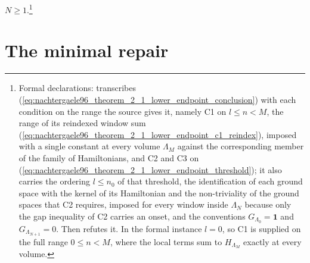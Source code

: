 \documentclass{article}
\begin{document}
$N\geq1$.\footnote{Formal declarations:
     transcribes
    (\ref{eq:nachtergaele96_theorem_2_1_lower_endpoint_conclusion}) with each
    condition on the range the source gives it, namely C1 on $l\leq n<M$, the
    range of its reindexed window sum
    (\ref{eq:nachtergaele96_theorem_2_1_lower_endpoint_c1_reindex}), imposed
    with a single constant at every volume $\Lambda_M$ against the
    corresponding member of the family of Hamiltonians, and C2 and C3 on
    (\ref{eq:nachtergaele96_theorem_2_1_lower_endpoint_threshold}); it also
    carries the ordering $l\leq n_0$ of that threshold, the identification of
    each ground space with the kernel of its Hamiltonian and the
    non-triviality of the ground spaces that C2 requires, imposed for every
    window inside $\Lambda_N$ because only the gap inequality of C2 carries an
    onset, and the conventions
    $G_{\Lambda_0}=\mathbf 1$ and $G_{\Lambda_{N+1}}=0$. Then
     refutes it.
    In the formal instance $l=0$, so C1 is supplied on the full range
    $0\leq n<M$, where the local terms sum to $H_{\Lambda_M}$ exactly at every
    volume.}

\section{The minimal repair}
\end{document}
